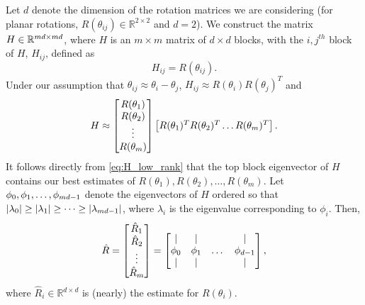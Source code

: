 Let $d$ denote the dimension of the rotation matrices we are considering (for planar rotations, $R(\theta_{ij}) \in \mathbb{R}^{2 \times 2}$ and $d=2$).
%
We construct the matrix $H \in \mathbb{R}^{m d \times m d}$, where $H$ is an $m \times m$ matrix of $d \times d$ blocks, with the $i,j^{th}$ block of $H$, $H_{ij}$, defined as
\begin{equation} \label{eq:H_to_R}
H_{ij} = R(\theta_{ij}).
\end{equation}
%
%
Under our assumption that $\theta_{ij} \approx \theta_i - \theta_j$, $H_{ij} \approx R(\theta_i) R(\theta_j)^T$
 and
\begin{equation} \label{eq:H_low_rank}
	H \approx
	\begin{bmatrix}
	R(\theta_1) \\
	R(\theta_2) \\
	\vdots \\
	R(\theta_m)
	\end{bmatrix}
	\begin{bmatrix}
	R(\theta_1)^T R(\theta_2)^T \dots R(\theta_m)^T
	\end{bmatrix}.
\end{equation}
%
It follows directly from \eqref{eq:H_low_rank} that the top block eigenvector of $H$ contains our best estimates of $R(\theta_1), R(\theta_2), \dots, R(\theta_m)$.
%
Let $\phi_0, \phi_1, \dots, \phi_{m d-1}$ denote the eigenvectors of $H$ ordered so that $|\lambda_0| \ge |\lambda_1| \ge \dots \ge |\lambda_{m d -1}|$, where $\lambda_i$ is the eigenvalue corresponding to $\phi_i$.
%
Then,
\begin{equation} \label{eq:R_hat}
\hat{R} =
\begin{bmatrix}
\hat{R}_1 \\
\hat{R}_2 \\
\vdots \\
\hat{R}_m
\end{bmatrix} =
\begin{bmatrix}
| & | & & | \\
\phi_0 & \phi_1 & \dots & \phi_{d-1} \\
| & | & & |
\end{bmatrix},
\end{equation}
where $\hat{R}_i \in \mathbb{R}^{d \times d}$ is (nearly) the estimate for $R(\theta_i)$.
